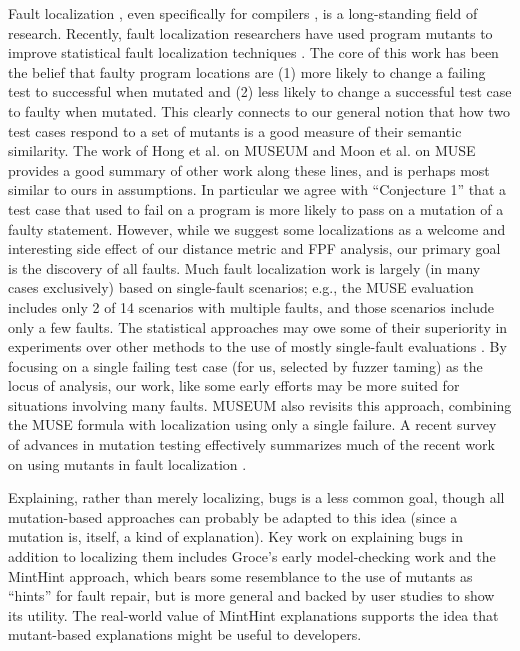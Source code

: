 Fault localization \cite{FaultSurvey,NearNeighbor,Liblit03,Liblit05,Cleve05,Jones2002,Jones05,Jones07,GroceError,ChakiLev,Liu06,SPIN03,Santelices:ICSE:2009,Abreu:2006:PRDC,xuan2014test,DD}, even specifically for compilers \cite{Whalley94}, is a long-standing field of research.  Recently, fault localization researchers have used program mutants to improve statistical \cite{Jones2002} fault localization techniques \cite{MUSE,DebroyMutant,FasterMutant,multilingual,Metallaxis,Papadakis}.
The core of this work has been the belief that faulty program locations are (1) more likely to change a failing test to successful when mutated and (2) less likely to change a successful test case to faulty when mutated.  This clearly connects to our general notion that how two test cases respond to a set of mutants is a good measure of their semantic similarity.
The work of Hong et al. \cite{multilingual} on MUSEUM and Moon et al. \cite{MUSE} on MUSE provides a good summary of other work along these lines, and is perhaps most similar to ours in assumptions. In particular we agree with ``Conjecture 1'' that a test case that used to fail on a program is more likely to pass on a mutation of a faulty statement.  However, while we suggest some localizations as a welcome and interesting side effect of our distance metric and FPF analysis, our primary goal is the discovery of all faults. Much fault localization work is largely (in many cases exclusively) based on single-fault scenarios; e.g., the MUSE \cite{MUSE} evaluation includes only 2 of 14 scenarios with multiple faults, and those scenarios include only a few faults.   The statistical approaches may owe some of their superiority in experiments over other methods to the use of mostly single-fault evaluations \cite{Jones05}.  By focusing on a single failing test case (for us, selected by fuzzer taming) as the locus of analysis, our work, like some early efforts \cite{NearNeighbor,Cleve05,GroceError} may be more suited for situations involving many faults.  MUSEUM \cite{multilingual} also revisits this approach, combining the MUSE formula with localization using only a single failure.
A recent survey of advances in mutation testing effectively summarizes much of the recent work on using mutants in fault localization \cite{MutationSurvey}.

Explaining, rather than merely localizing, bugs is a less common goal, though all mutation-based approaches can probably be adapted to this idea (since a mutation is, itself, a kind of explanation).  Key work on explaining bugs in addition to localizing them includes Groce's early model-checking work \cite{GroceError,ChakiLev} and the MintHint \cite{MintHint} approach, which bears some resemblance to the use of mutants as ``hints'' for fault repair, but is more general and backed by user studies to show its utility.  The real-world value of MintHint explanations supports the idea that mutant-based explanations might be useful to developers.

